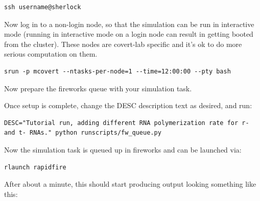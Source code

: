\documentclass[12pt]{article}
\begin{document}
\lstset{language=bash}
\begin{lstlisting}
ssh username@sherlock
\end{lstlisting}

Now log in to a non-login node, so that the simulation can be run in interactive mode (running in interactive mode on a login node can result in getting booted from the cluster). These nodes are covert-lab specific and it's ok to do more serious computation on them.

\begin{lstlisting}
srun -p mcovert --ntasks-per-node=1 --time=12:00:00 --pty bash
\end{lstlisting}

Now prepare the fireworks queue with your simulation task. 
\par
Once setup is complete, change the DESC description text as desired, and run:

\begin{lstlisting}
DESC="Tutorial run, adding different RNA polymerization rate for r- and t- RNAs." python runscripts/fw_queue.py
\end{lstlisting}

Now the simulation task is queued up in fireworks and can be launched via:

\begin{lstlisting}
rlaunch rapidfire
\end{lstlisting}

After about a minute, this should start producing output looking something like this:
\end{document}
